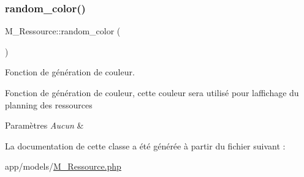 \subsubsection{\texorpdfstring{random\+\_\+color()}{random\_color()}}
{\footnotesize\ttfamily M\+\_\+\+Ressource\+::random\+\_\+color (\begin{DoxyParamCaption}{ }\end{DoxyParamCaption})}



Fonction de génération de couleur. 

Fonction de génération de couleur, cette couleur sera utilisé pour l\textquotesingle{}affichage du planning des ressources 
\begin{DoxyParams}{Paramètres}
{\em Aucun} & \\
\hline
\end{DoxyParams}


La documentation de cette classe a été générée à partir du fichier suivant \+:\begin{DoxyCompactItemize}
\item 
app/models/\hyperlink{_m___ressource_8php}{M\+\_\+\+Ressource.\+php}\end{DoxyCompactItemize}
